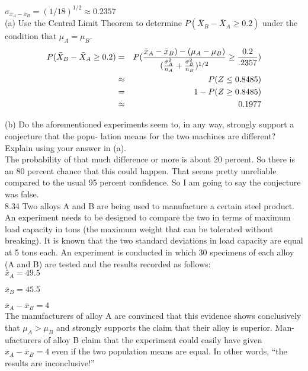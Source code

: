 $\sigma_{\bar{x}_A - \bar{x}_B} = (1/18)^{1/2} \approx 0.2357$ \\

(a) Use the Central Limit Theorem to determine $P(\bar{X}_B - \bar{X}_A \geq 0.2)$
under the condition that $\mu_A = \mu_B$. \\

\begin{eqnarray*}
P(\bar{X}_B - \bar{X}_A \geq 0.2) 
& = & P(\frac{\bar{x}_A - \bar{x}_B) - (\mu_A - \mu_B)}{(
\frac{\sigma^2_A}{n_A} + \frac{\sigma^2_B}{n_B}  )^{1/2}} \geq \frac{0.2}{.2357}) \\
& \approx & P(Z \leq 0.8485) \\
& = & 1- P(Z \geq 0.8485) \\
& \approx & 0.1977
\end{eqnarray*}


(b) Do the aforementioned experiments seem to, in any
way, strongly support a conjecture that the popu-
lation means for the two machines are different?
Explain using your answer in (a). \\

The probability of that much difference or more is about 20 percent. So there is an 80 percent chance that this could happen. That seems pretty unreliable compared to the usual 95 percent confidence. So I am going to say the conjecture was false. \\ 

8.34 Two alloys A and B are being used to manufacture a certain steel product. An experiment needs to
be designed to compare the two in terms of maximum
load capacity in tons (the maximum weight that can
be tolerated without breaking). It is known that the
two standard deviations in load capacity are equal at
5 tons each. An experiment is conducted in which 30
specimens of each alloy (A and B) are tested and the
results recorded as follows: \\

$\bar{x}_A = 49.5$

$\bar{x}_B = 45.5$

$\bar{x}_A - \bar{x}_B = 4$ \\

The manufacturers of alloy A are convinced that this
evidence shows conclusively that $\mu_A > \mu_B$ and strongly
supports the claim that their alloy is superior. Man-
ufacturers of alloy B claim that the experiment could
easily have given $\bar{x}_A - \bar{x}_B = 4$ even if the two population means are equal. In other words, “the results are
inconclusive!” \\


